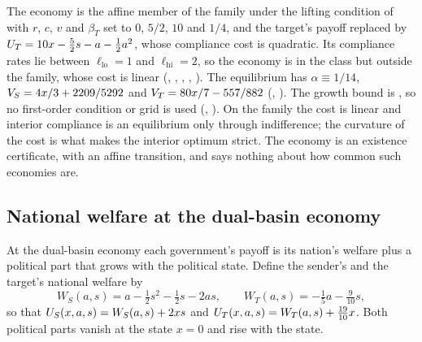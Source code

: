The economy is the affine member of the family under the lifting condition of  with $r$,
$c$, $v$ and $\beta_T$ set to $0$, $5/2$, $10$ and $1/4$, and the target's payoff
replaced by
$U_T=10x-\tfrac52s-a-\tfrac12a^2$, whose compliance cost is quadratic. Its compliance
rates lie between $\ell_{\mathrm{lo}}=1$ and $\ell_{\mathrm{hi}}=2$, so the economy is in
the class but outside the family, whose cost is linear (,
, , , ). The
equilibrium has $\alpha\equiv1/14$, $V_S=4x/3+2209/5292$ and $V_T=80x/7-557/882$
(, ). The growth bound is , so no
first-order condition or grid is used (,
). On the family the cost is linear
and interior compliance is an equilibrium only through indifference; the curvature of
the cost is what makes the interior optimum strict. The economy is an existence
certificate, with an affine transition, and says nothing about how common such economies
are.

\subsection{National welfare at the dual-basin economy}
\label{app:entrenchment-welfare}

At the dual-basin economy each government's payoff is its nation's welfare plus a
political part that grows with the political state. Define the sender's and the
target's national welfare by
\[
W_S(a,s)=a-\tfrac12s^2-\tfrac12s-2as,\qquad
W_T(a,s)=-\tfrac15a-\tfrac{9}{10}s ,
\]
so that $U_S(x,a,s)=W_S(a,s)+2xs$ and $U_T(x,a,s)=W_T(a,s)+\tfrac{19}{10}x$. Both
political parts vanish at the state $x=0$ and rise with the state.

